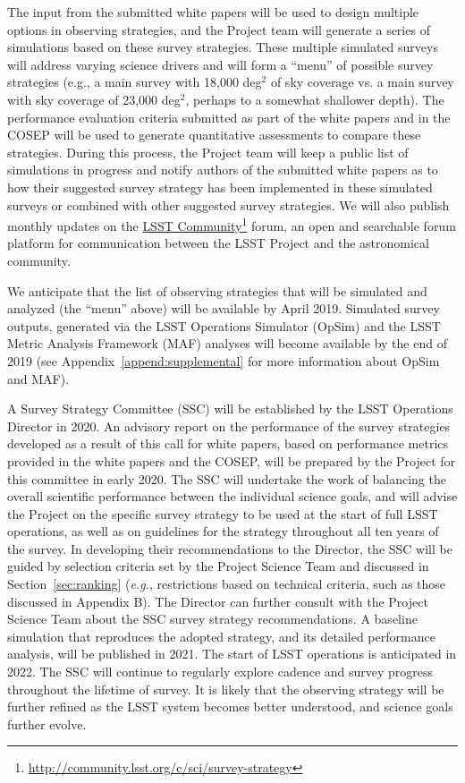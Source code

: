 \documentclass[DM,toc,usenatbib]{lsstdoc}
\begin{document}
The input from the submitted white papers will be used to design multiple
options in observing strategies, and the Project team will generate a series of
simulations based on these survey strategies. These multiple simulated surveys will address 
varying science drivers and will form a ``menu'' of possible survey strategies (e.g., a main 
survey with 18,000 deg$^2$ of sky coverage vs. a main survey with sky coverage of 23,000 deg$^2$, perhaps to a
somewhat shallower depth). The performance evaluation criteria submitted as part of the 
white papers and in the COSEP will be used to generate quantitative assessments to compare these strategies.
During this process, the Project team will keep a public list of simulations in progress and notify authors
of the submitted white papers as to how their suggested survey strategy has been implemented
in these simulated surveys or combined with other suggested survey strategies.
We will also publish monthly updates on the \href{https://community.lsst.org/c/sci}{LSST Community}\footnote{\url{http://community.lsst.org/c/sci/survey-strategy}}
forum, an open and searchable forum platform for communication between the 
LSST Project and the astronomical community.

We anticipate that the list of observing strategies that will be simulated and analyzed 
(the ``menu'' above) will be available by April 2019. Simulated survey outputs, generated via the LSST 
Operations Simulator (OpSim) and the LSST Metric Analysis 
Framework (MAF) analyses will become available by the end 
of 2019 (see Appendix~\ref{append:supplemental} for more information about OpSim and MAF). 

A Survey Strategy Committee (SSC) will be established by the LSST Operations Director 
in 2020. An advisory report on the performance of the survey strategies developed as a result of this call for white papers, based on 
performance metrics provided in the white papers and the COSEP, will be prepared by the Project for this 
committee in early 2020. The SSC will undertake the work of balancing the overall scientific performance between the 
individual science goals, and will advise the Project on the specific survey strategy to be
used at the start of full LSST operations, as well as on guidelines for the strategy throughout all ten years of the survey. 
In developing their recommendations to the Director, the SSC will be guided by selection 
criteria set by the Project Science Team and discussed in Section~\ref{sec:ranking} ({\it e.g.}, restrictions 
based on technical criteria, such as those discussed in Appendix B). The Director can further consult with the Project Science 
Team about the SSC survey strategy recommendations. A baseline simulation that reproduces the
adopted strategy, and its detailed performance analysis, will be published in 2021. 
The start of LSST operations is anticipated in 2022. The SSC will continue to regularly explore 
cadence and survey progress throughout the lifetime of survey. It is likely that the observing
strategy will be further refined as the LSST system becomes better understood, and science goals 
further evolve.
\end{document}
